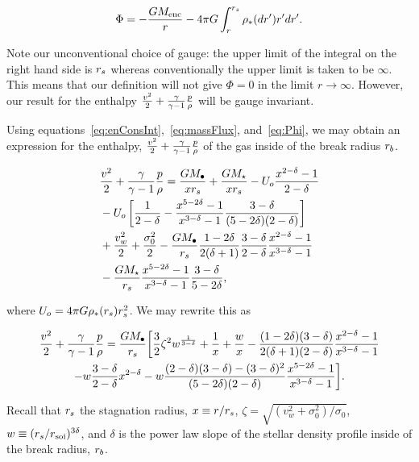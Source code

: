\begin{align}
\Phi= -\frac{G M_{\rm enc}}{r} - 4 \pi G \int_{r}^{r_s} \rho_*(dr') r'
dr'.
\label{eq:Phi}
\end{align}

Note our unconventional choice of gauge: the upper limit of the
integral on the right hand side is $r_s$ whereas conventionally the
upper limit is taken to be $\infty$. This means that our definition
will not give $\Phi=0$ in the limit $r\rightarrow\infty$. However,
our result for the enthalpy $\frac{v^2}{2} + \frac{\gamma}{\gamma-1} \frac{p}{\rho}$ will be
gauge invariant. 

Using equations~\eqref{eq:enConsInt},~\eqref{eq:massFlux},
and~\eqref{eq:Phi}, we may obtain an expression for the enthalpy,
$\frac{v^2}{2}+\frac{\gamma}{\gamma-1} \frac{p}{\rho}$ of the gas inside of the break radius
$r_b$. 

\begin{align}
  &\frac{v^2}{2}+\frac{\gamma}{\gamma-1} \frac{p}{\rho} = \frac{G M_{\bullet}}{x r_s} +
  \frac{G
    M_\star}{x r_s} - U_o \frac{x^{2-\delta}-1}{2-\delta}\nonumber\\
  &-U_o\left[\frac{1}{2-\delta}-\frac{x^{5-2\delta}-1}{x^{3-\delta}-1}\frac{3-\delta}{(5-2\delta)(2-\delta)}\right]\nonumber\\
  &+\frac{v_w^2}{2}+\frac{\sigma_0^2}{2}- \frac{G M_{\bullet}}{r_s}
  \frac{1-2\delta}{2(\delta+1)} \frac{3-\delta}{2-\delta}\frac{x^{2-\delta}-1}{x^{3-\delta}-1}
  \nonumber\\
  &-\frac{G M_\star}{r_s}
  \frac{x^{5-2\delta}-1}{x^{3-\delta}-1}\frac{3-\delta}{5-2\delta},
\end{align}

where $U_o=4 \pi G \rho_*(r_s) r_s^2$.  We may rewrite this as 

\begin{multline}
  \frac{v^2}{2}+\frac{\gamma}{\gamma-1} \frac{p}{\rho}
=\frac{G M_{\bullet}}{r_s} 
\biggl[
  \frac{3}{2} \zeta^2 w^{\frac{1}{3 -\delta}}+\frac{1}{x}+\frac{w}{x}
  -\frac{(1-2\delta)(3-\delta)}{2(\delta+1)(2-\delta)}  \frac{x^{2  -\delta}-1}{x^{3-\delta}-1}\\
  -w \frac{3 -\delta}{2 -\delta} x^{2 -\delta}
  -w \frac{(2-\delta)(3-\delta)-(3-\delta)^{2}}{(5-2\delta)(2-\delta)} \frac{x^{5-2\delta}-1}{x^{3-\delta}-1}
\biggr].
\label{eq:enthAnal}
\end{multline}

Recall that $r_s$ the stagnation radius, $x\equiv r/r_s$, $\zeta=\sqrt{(v_w^2+\sigma_0^2)/\sigma_0}$, $w\equiv (r_s/r_{\rm soi})^{3\delta}$, and
$\delta$ is the power law slope of the stellar density profile inside
of the break radius, $r_b$.

